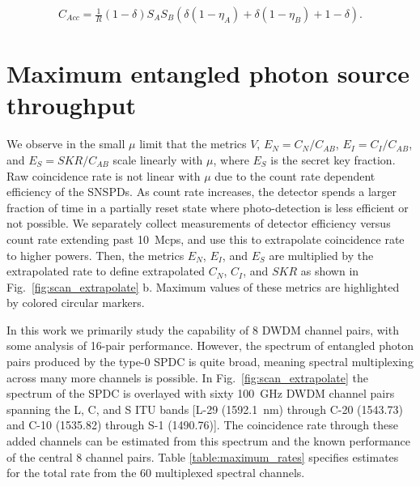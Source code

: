 \documentclass[11pt]{caltech_thesis} %
\begin{document}
\begin{align}
C_{Acc} = \frac{1}{R}(1 - \delta) S_A S_B \left(\delta \left(1-\eta _A\right)+\delta \left(1-\eta _B\right)+1-\delta\right).
\end{align}

\hypertarget{maximum-entangled-photon-source-throughput}{%
\section{Maximum entangled photon source throughput}\label{maximum-entangled-photon-source-throughput}}

We observe in the small $\mu$ limit that the metrics $V$, $E_N = C_N/C_{AB}$, $E_I = C_I/C_{AB}$, and $E_S = SKR/C_{AB}$ scale linearly with $\mu$, where $E_S$ is the secret key fraction. Raw coincidence rate is not linear with $\mu$ due to the count rate dependent efficiency of the SNSPDs. As count rate increases, the detector spends a larger fraction of time in a partially reset state where photo-detection is less efficient or not possible. We separately collect measurements of detector efficiency versus count rate extending past 10~Mcps, and use this to extrapolate coincidence rate to higher powers. Then, the metrics $E_N$, $E_I$, and $E_S$ are multiplied by the extrapolated rate to define extrapolated $C_N$, $C_I$, and $SKR$ as shown in Fig.~\ref{fig:scan_extrapolate} b. Maximum values of these metrics are highlighted by colored circular markers.

In this work we primarily study the capability of 8 DWDM channel pairs, with some analysis of 16-pair performance. However, the spectrum of entangled photon pairs produced by the type-0 SPDC is quite broad, meaning spectral multiplexing across many more channels is possible. In Fig.~\ref{fig:scan_extrapolate} the spectrum of the SPDC is overlayed with sixty 100~GHz DWDM channel pairs spanning the L, C, and S ITU bands {[}L-29 (1592.1~nm) through C-20 (1543.73) and C-10 (1535.82) through S-1 (1490.76){]}. The coincidence rate through these added channels can be estimated from this spectrum and the known performance of the central 8 channel pairs. Table \ref{table:maximum_rates} specifies estimates for the total rate from the 60 multiplexed spectral channels.
\end{document}
